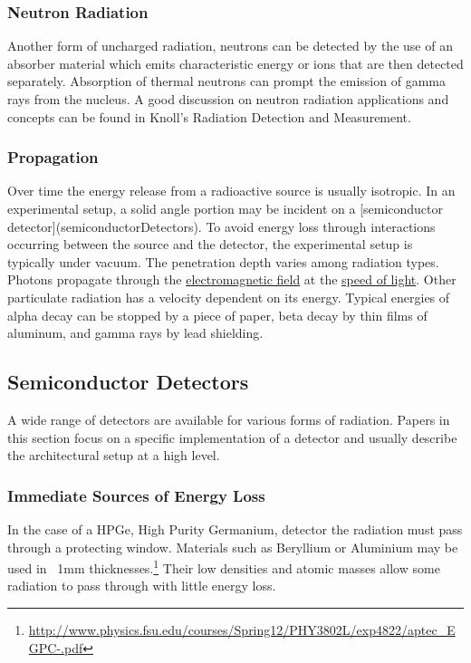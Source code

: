 \documentclass[12pt]{article}
\begin{document}
\begin{doublespacing}
\subsubsection{Neutron Radiation}
Another form of uncharged radiation, neutrons can be detected by the use of an absorber material which emits characteristic energy or ions that are then detected separately.
Absorption of thermal neutrons can prompt the emission of gamma rays from the nucleus.
A good discussion on neutron radiation applications and concepts can be found in Knoll's Radiation Detection and Measurement.

\subsubsection{Propagation}
Over time the energy release from a radioactive source is usually isotropic. In an experimental setup, a solid angle portion may be incident on a [semiconductor detector](semiconductorDetectors). To avoid energy loss through interactions occurring between the source and the detector, the experimental setup is typically under vacuum. 
The penetration depth varies among radiation types. Photons propagate through the \href{https://en.wikipedia.org/wiki/Electromagnetic_field}{electromagnetic field} at the \href{https://en.wikipedia.org/wiki/Speed_of_light}{speed of light}. Other particulate radiation has a velocity dependent on its energy. Typical energies of alpha decay can be stopped by a piece of paper, beta decay by thin films of aluminum, and gamma rays by lead shielding.


\subsection{Semiconductor Detectors}   %
A wide range of detectors are available for various forms of radiation.
Papers in this section focus on a specific implementation of a detector and usually describe the architectural setup at a high level.

\subsubsection{Immediate Sources of Energy Loss}

In the case of a HPGe, High Purity Germanium, detector the radiation must pass through a protecting window. 
Materials such as Beryllium or Aluminium may be used in ~1mm thicknesses.\footnote{\url{http://www.physics.fsu.edu/courses/Spring12/PHY3802L/exp4822/aptec_EGPC-.pdf}} 
Their low densities and atomic masses allow some radiation to pass through with little energy loss.
\\


\end{doublespacing}
\end{document}
